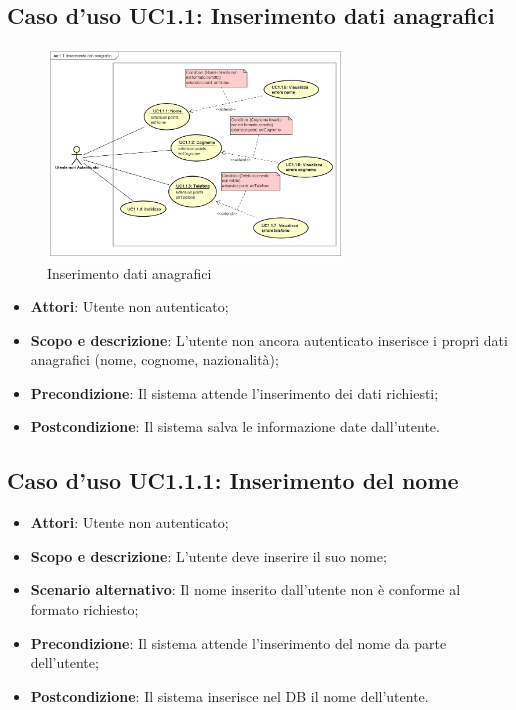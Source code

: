 \documentclass[12pt,a4paper,titlepage]{article}
\begin{document}
	\subsection{Caso d'uso UC1.1: Inserimento dati anagrafici}
	\label{UC1.1}
	\begin{figure}[ht]
		\centering
		\includegraphics[width=0.7\textwidth]{UseCase/InserimentoDatiAnagrafici}
		\caption{Inserimento dati anagrafici}
	\end{figure}
	\begin{itemize}
		\item \textbf{Attori}: Utente non autenticato;
		\item \textbf{Scopo e descrizione}: L'utente non ancora autenticato inserisce i propri dati anagrafici (nome, cognome, nazionalità);
		\item \textbf{Precondizione}: Il sistema attende l'inserimento dei dati richiesti;
		\item \textbf{Postcondizione}: Il sistema salva le informazione date dall'utente.
	\end{itemize}

	\subsection{Caso d'uso UC1.1.1: Inserimento del nome}
	\label{UC1.1.1}
	\begin{itemize}
		\item \textbf{Attori}: Utente non autenticato; 
		\item \textbf{Scopo e descrizione}: L'utente deve inserire il suo nome;
		\item \textbf{Scenario alternativo}: Il nome inserito dall'utente non è conforme al formato richiesto;
		\item \textbf{Precondizione}: Il sistema attende l'inserimento del nome da parte dell'utente;
		\item \textbf{Postcondizione}: Il sistema inserisce nel DB il nome dell'utente.
	\end{itemize}
\end{document}

